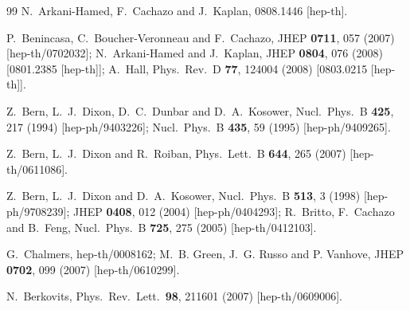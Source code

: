 \documentclass[aps,prl,twocolumn,groupedaddress,draft,showpacs,nofootinbib]{revtex4}
\begin{document}
\begin{thebibliography}{99}
N.~Arkani-Hamed, F.~Cachazo and J.~Kaplan,
0808.1446 [hep-th].

P.~Benincasa, C.~Boucher-Veronneau and F.~Cachazo,
JHEP {\bf 0711}, 057 (2007)
[hep-th/0702032];
N.~Arkani-Hamed and J.~Kaplan,
JHEP {\bf 0804}, 076 (2008)
[0801.2385 [hep-th]];
%
A.~Hall,
Phys.\ Rev.\  D {\bf 77}, 124004 (2008)
[0803.0215 [hep-th]].

Z.~Bern, L.~J.~Dixon, D.~C.~Dunbar and D.~A.~Kosower,
Nucl.\ Phys.\ B {\bf 425}, 217 (1994)
[hep-ph/9403226];
%
Nucl.\ Phys.\ B {\bf 435}, 59 (1995)
[hep-ph/9409265].

Z.~Bern, L.~J.~Dixon and R.~Roiban,
Phys.\ Lett.\ B {\bf 644}, 265 (2007)
[hep-th/0611086].

Z.~Bern, L.~J.~Dixon and D.~A.~Kosower,
Nucl.\ Phys.\ B {\bf 513}, 3 (1998)
[hep-ph/9708239];
%
JHEP {\bf 0408}, 012 (2004)
[hep-ph/0404293];
%
R.~Britto, F.~Cachazo and B.~Feng,
Nucl.\ Phys.\ B {\bf 725}, 275 (2005)
[hep-th/0412103].

G.~Chalmers,
hep-th/0008162;
%
M.~B. Green, J.~G. Russo and P. Vanhove,
JHEP {\bf 0702}, 099 (2007)
[hep-th/0610299].

N.~Berkovits,
Phys.\ Rev.\ Lett.\  {\bf 98}, 211601 (2007)
[hep-th/0609006].


\end{thebibliography}
\end{document}
